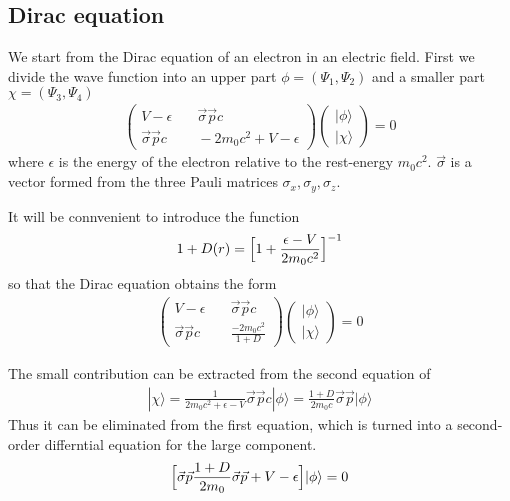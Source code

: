 \documentclass[11pt,a4paper]{report}
\begin{document}
\subsection{Dirac equation}

We start from the Dirac equation of an electron in an electric field.
First we divide the wave function into an upper part
$\phi=(\Psi_1,\Psi_2)$ and a smaller part $\chi=(\Psi_3,\Psi_4)$
\begin{eqnarray}
\left(\begin{array}{cc}
V-\epsilon &\quad \vec{\sigma}\vec{p}c\\
\vec{\sigma}\vec{p}c &\quad -2m_0c^2+V-\epsilon\end{array}\right)
\left(\begin{array}{c}|\phi\rangle\\|\chi\rangle\end{array}\right)=0
\label{eq:dirac2by2withepsilon}
\end{eqnarray}
where $\epsilon$ is the energy of the electron relative to the
rest-energy $m_0c^2$. $\vec{\sigma}$ is a vector formed from the three
Pauli matrices $\sigma_x,\sigma_y,\sigma_z$.

It will be connvenient to introduce the function
\begin{eqnarray}
1+D(r)=\Bigl[1+\frac{\epsilon-V}{2m_0c^2}\Bigr]^{-1}
\end{eqnarray}
so that the Dirac equation obtains the form
\begin{eqnarray}
\left(\begin{array}{cc}
V-\epsilon &\quad \vec{\sigma}\vec{p}c\\
\vec{\sigma}\vec{p}c &\quad \frac{-2m_0c^2}{1+D}\end{array}\right)
\left(\begin{array}{c}|\phi\rangle\\|\chi\rangle\end{array}\right)=0
\label{eq:dirac2by2withepsilonb}
\end{eqnarray}

The small contribution can be extracted from the second equation of
\begin{eqnarray}
|\chi\rangle
=\frac{1}{2m_0c^2+\epsilon-V}
\vec{\sigma}\vec{p}c |\phi\rangle
=\frac{1+D}{2m_0c}
\vec{\sigma}\vec{p} |\phi\rangle
\end{eqnarray}
Thus it can be eliminated from the first equation, which is turned
into a second-order differntial equation for the large component.
\begin{eqnarray}
\Bigl[\vec{\sigma}\vec{p} \frac{1+D}{2m_0}
\vec{\sigma}\vec{p} +V-\epsilon\Bigr]|\phi\rangle=0
\end{eqnarray}
\end{document}
